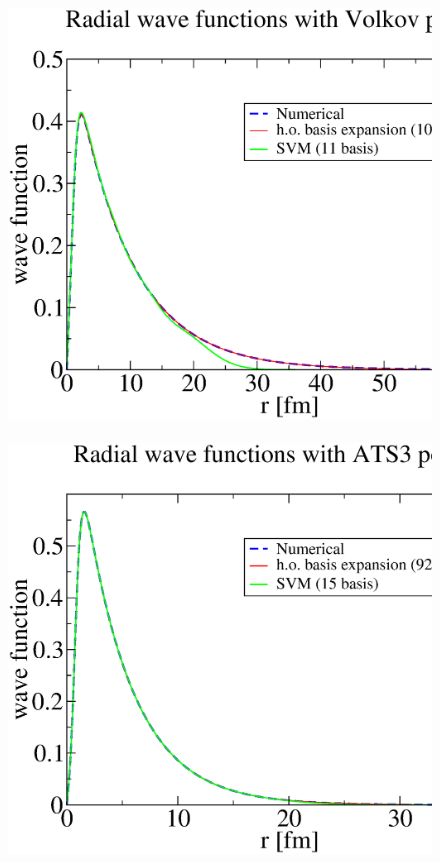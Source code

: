 \documentclass[12pt,a4paper,titlepage]{jarticle}
\begin{document}
\begin{figure}[H]
\begin{center}
\includegraphics[width=140mm,height=110mm]{wave-fcts2.eps}
\end{center}
\end{figure}

\begin{figure}[H]
\begin{center}
\includegraphics[width=140mm,height=110mm]{wave-fcts3.eps}
\end{center}
\end{figure}
\end{document}
